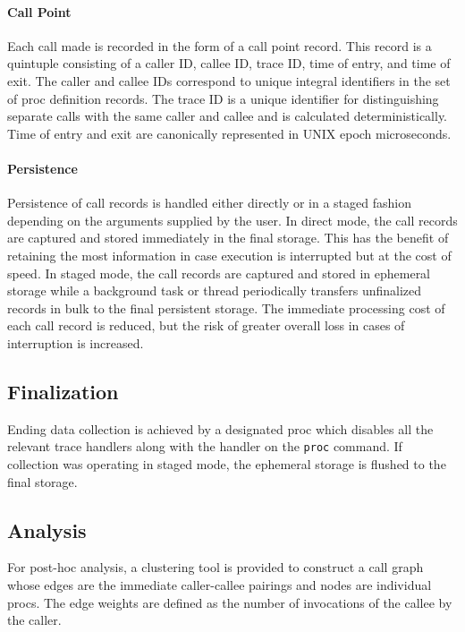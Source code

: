 \documentclass{article}[letter,10pt]
\begin{document}
{{    \paragraph{Call Point}{
      Each call made is recorded in the form of a call point record. This record
      is a quintuple consisting of a caller ID, callee ID, trace ID, time of
      entry, and time of exit. The caller and callee IDs correspond to unique
      integral identifiers in the set of proc definition records. The trace ID is a
      unique identifier for distinguishing separate calls with the same caller
      and callee and is calculated deterministically. Time of entry and exit are
      canonically represented in UNIX epoch microseconds.
    }
    \paragraph{Persistence}{
      Persistence of call records is handled either directly or in a staged fashion
      depending on the arguments supplied by the user. In direct mode, the call
      records are captured and stored immediately in the final storage. This has
      the benefit of retaining the most information in case execution is interrupted
      but at the cost of speed. In staged mode, the call records are captured and
      stored in ephemeral storage while a background task or thread periodically
      transfers unfinalized records in bulk to the final persistent storage. The
      immediate processing cost of each call record is reduced, but the risk of
      greater overall loss in cases of interruption is increased.
    }
  }
  \subsection{Finalization}{
    Ending data collection is achieved by a designated proc which disables
    all the relevant trace handlers along with the handler on the \texttt{proc} command.
    If collection was operating in staged mode, the ephemeral storage is flushed
    to the final storage.
  }
  \subsection{Analysis}{
    For post-hoc analysis, a clustering tool is provided to construct a call graph
    whose edges are the immediate caller-callee pairings and nodes are individual
    procs. The edge weights are defined as the number of invocations of the callee
    by the caller.

}}
\end{document}
